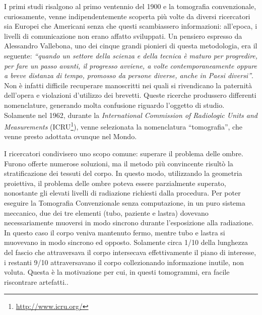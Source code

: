 \documentclass[a4paper,12pt, doubleside]{report}
\begin{document}
                \bigskip            
                \par
                    I primi studi risalgono al primo ventennio del 1900 e la tomografia convenzionale, curiosamente, venne indipendentemente scoperta più volte da diversi ricercatori sia Europei che Americani senza che questi scambiassero informazioni: all'epoca, i livelli di comunicazione non erano affatto sviluppati. Un pensiero espresso da Alessandro Vallebona, uno dei cinque grandi pionieri di questa metodologia, era il seguente: \textit{“quando un settore della scienza e della tecnica è maturo per progredire, per fare un passo avanti, il progresso avviene, a volte contemporaneamente oppure a breve distanza di tempo, promosso da persone diverse, anche in Paesi diversi”}\cite{vallebona-pensiero}.
                    Non è infatti difficile recuperare manoscritti nei quali si rivendicano la paternità dell'opera e violazioni d'utilizzo dei brevetti\cite{vallebona-difesa}. Queste ricerche produssero differenti nomenclature, generando molta confusione riguardo l'oggetto di studio. Solamente nel 1962, durante la \textit{International Commission of Radiologic Units and Measurements} (ICRU\footnote{\url{http://www.icru.org/}}), venne selezionata la nomenclatura “tomografia”, che venne presto adottata ovunque nel Mondo.
                            
                \bigskip
                \par
                    I ricercatori condivisero uno scopo comune: superare il problema delle ombre. Furono offerte numerose soluzioni, ma il metodo più convincente risultò la stratificazione dei tessuti del corpo. In questo modo, utilizzando la geometria proiettiva, il problema delle ombre poteva essere parzialmente superato, nonostante gli elevati livelli di radiazione richiesti dalla procedura. Per poter eseguire la Tomografia Convenzionale senza computazione, in un puro sistema meccanico, due dei tre elementi (tubo, paziente e lastra) dovevano necessariamente muoversi in modo sincrono durante l’esposizione alla radiazione.  In questo caso il corpo veniva mantenuto fermo, mentre tubo e lastra si muovevano in modo sincrono ed opposto. Solamente circa 1/10 della lunghezza del fascio che attraversava il corpo intersecava effettivamente il piano di interesse, i restanti 9/10 attraversavano il corpo collezionando informazione inutile, non voluta. Questa è la motivazione per cui, in questi tomogrammi, era facile riscontrare artefatti.\cite{hounsfield-nobel-lecture}.
                
\end{document}
